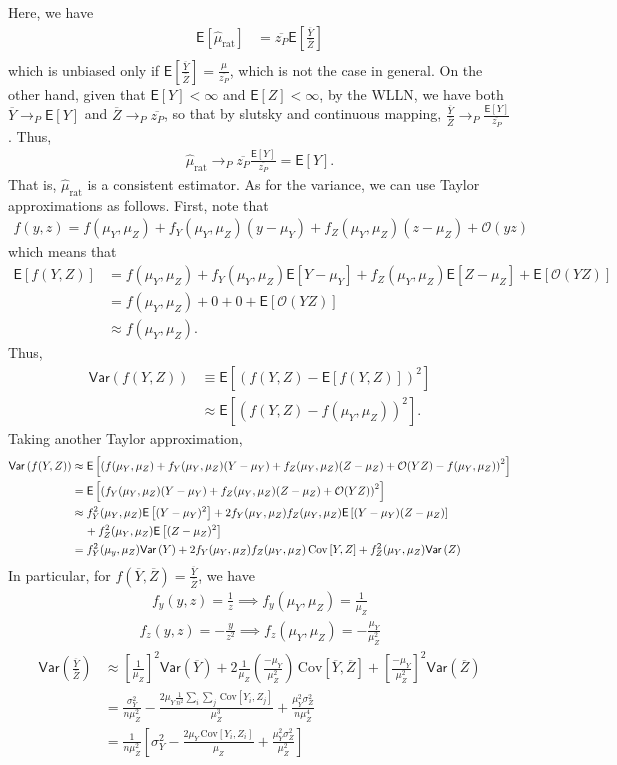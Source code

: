 \documentclass[11pt]{article}
\newcommand*\htab{\hspace{4 mm}}
\newcommand*\mean[1]{\overline{#1}}
\newcommand*\ba{\[ \begin{aligned}}
\newcommand*\ea{\end{aligned} \]}
\newcommand*\E[1]{\mathsf{E}\left[#1\right]}
\newcommand*\Var[1]{\mathsf{Var}\left(#1\right)}
\newcommand*\Cov[1]{\;\text{Cov}\left[#1\right]}
\newcommand*\estim[1]{\widehat{#1}}
\renewcommand\;{\,}
\begin{document}
\item %
    Here, we have
    \ba
    \E{\estim{\mu}_\text{rat}} & = \overline{z_P} 
        \E{\frac{\mean{Y}}{\mean{Z}}} \\
    \ea
which is unbiased only if $\E{\frac{\mean{Y}}{\overline{Z}}} = \frac{\mu}{\overline{z_P}}$, which is not the case in general.
On the other hand, given that $\E{Y} < \infty$ and $\E{Z} < \infty$, by the WLLN, we have both $\overline{Y} \to_P \E{Y}$ and 
$\overline{Z} \to_P \overline{z_P}$, so that by slutsky and continuous mapping,
$\frac{\overline{Y}}{\overline{Z}} \to_P \frac{\E{Y}}{\overline{z_P}}$. 
Thus,
\ba
\estim{\mu}_\text{rat} \to_P \overline{z_P} \frac{ \E{Y} }{\overline{z_P}} 
    = \E{Y}.
\ea
That is, $\estim{\mu}_\text{rat}$ is a consistent estimator.
As for the variance, we can use Taylor approximations as follows.
First, note that
\ba
f(y, z) = f(\mu_Y, \mu_Z) + f_Y(\mu_Y, \mu_Z) (y - \mu_Y) 
	+ f_Z(\mu_Y, \mu_Z)(z - \mu_Z) + \mathcal O(yz)
\ea
which means that
\ba
\E{ f(Y, Z) } & = f(\mu_Y, \mu_Z) + f_Y(\mu_Y, \mu_Z) \E{Y - \mu_Y}
	+ f_Z(\mu_Y, \mu_Z) \E{Z - \mu_Z} + \E{\mathcal O(YZ)} \\
	& = f(\mu_Y, \mu_Z) + 0 + 0 + \E{\mathcal O(YZ) } \\
	& \approx f(\mu_Y, \mu_Z).
\ea
Thus,
\ba
\Var{f(Y, Z)} & \equiv \E{(f(Y, Z) - \E{f(Y, Z)})^2 } \\
	& \approx \E{( f(Y, Z) - f(\mu_Y, \mu_Z) )^2 }.
\ea
Taking another Taylor approximation,
\ba
\Var{f(Y, Z)} & \approx
	\E{ \left( f(\mu_Y, \mu_Z) + f_Y(\mu_Y, \mu_Z) (Y - \mu_Y) 
	+ f_Z(\mu_Y, \mu_Z)(Z - \mu_Z) 
	+ \mathcal O(YZ) - f(\mu_Y, \mu_Z) \right)^2 } \\
	& = \E{ \left( f_Y(\mu_Y, \mu_Z) (Y - \mu_Y) + f_Z(\mu_Y, \mu_Z)(Z - \mu_Z)
		+ \mathcal O(YZ) \right)^2 } \\ 
	& \approx
	f_Y^2(\mu_Y, \mu_Z) \E{(Y - \mu_Y)^2}
	+ 2 f_Y(\mu_Y, \mu_Z) f_Z(\mu_Y, \mu_Z) \E{(Y - \mu_Y)(Z - \mu_Z)} \\
	& \htab + f_Z^2(\mu_Y, \mu_Z) \E{(Z - \mu_Z)^2} \\
	& = f_Y^2(\mu_y, \mu_Z) \Var{Y} 
	+ 2 f_Y(\mu_Y, \mu_Z) f_Z(\mu_Y, \mu_Z) \Cov{Y, Z} 
	+ f_Z^2(\mu_Y, \mu_Z)\Var{Z} \\
\ea
In particular, for $f(\mean{Y}, \mean{Z}) = \frac{\mean{Y}}{\mean{Z}}$, we have
\ba
f_y(y, z) = \frac{1}{z} 
\implies f_y(\mu_Y, \mu_Z) = \frac{1}{\mu_Z} 
\ea
\ba
f_z(y, z) = -\frac{y}{z^2}
\implies f_z(\mu_Y, \mu_Z) = - \frac{\mu_Y}{\mu_Z^2}
\ea
\ba
\Var{\frac{\mean{Y}}{\mean{Z}}} & \approx
	\left[\frac{1}{\mu_Z}\right]^2 \Var{\mean Y}
	+ 2 \frac{1}{\mu_Z} \left(\frac{- \mu_Y}{\mu_Z^2}\right) \Cov{\mean Y, \mean Z}
	+ \left[\frac{-\mu_Y}{\mu_Z^2} \right]^2 \Var{\mean Z} \\
	& = \frac{\sigma_Y^2}{n \mu_Z^2}
		- \frac{ 2 \mu_Y \frac{1}{n^2} \sum_i \sum_j \Cov{Y_i, Z_j} }
			{ \mu_Z^3 }
		+ \frac{ \mu_Y^2 \sigma_Z^2 }{n \mu_Z^4} \\
	& = \frac{1}{n \mu_Z^2} \left[ \sigma_Y^2
		- \frac{2 \mu_Y \Cov{Y_i, Z_i} }{ \mu_Z }
		+ \frac{\mu_Y^2 \sigma_Z^2}{ \mu_Z^2 }
		\right]
\ea
 
\end{document}
